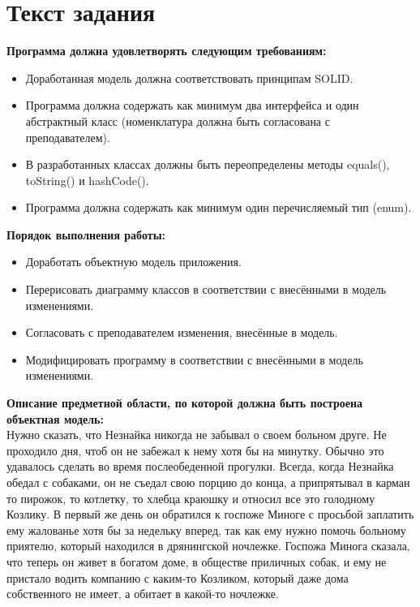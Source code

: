 \documentclass[12pt,onecolumn]{article}
\begin{document}
\section{Текст задания}
\textbf{Программа должна удовлетворять следующим требованиям:}
\begin{itemize}
  \item Доработанная модель должна соответствовать принципам SOLID.
  \item Программа должна содержать как минимум два интерфейса и один абстрактный класс (номенклатура должна быть согласована с преподавателем).
  \item В разработанных классах должны быть переопределены методы equals(), toString() и hashCode().
  \item Программа должна содержать как минимум один перечисляемый тип (enum).
\end{itemize}
\textbf{Порядок выполнения работы:}
\begin{itemize}
  \item Доработать объектную модель приложения.
  \item Перерисовать диаграмму классов в соответствии с внесёнными в модель изменениями.
  \item Согласовать с преподавателем изменения, внесённые в модель.
  \item Модифицировать программу в соответствии с внесёнными в модель изменениями.
\end{itemize}
\textbf{Описание предметной области, по которой должна быть построена объектная модель:}\\
Нужно сказать, что Незнайка никогда не забывал о своем больном друге. Не проходило дня, чтоб он не забежал к нему хотя бы на минутку. Обычно это удавалось сделать во время послеобеденной прогулки. Всегда, когда Незнайка обедал с собаками, он не съедал свою порцию до конца, а припрятывал в карман то пирожок, то котлетку, то хлебца краюшку и относил все это голодному Козлику. В первый же день он обратился к госпоже Миноге с просьбой заплатить ему жалованье хотя бы за недельку вперед, так как ему нужно помочь больному приятелю, который находился в дрянингской ночлежке. Госпожа Минога сказала, что теперь он живет в богатом доме, в обществе приличных собак, и ему не пристало водить компанию с каким-то Козликом, который даже дома собственного не имеет, а обитает в какой-то ночлежке.
\newpage
\end{document}
